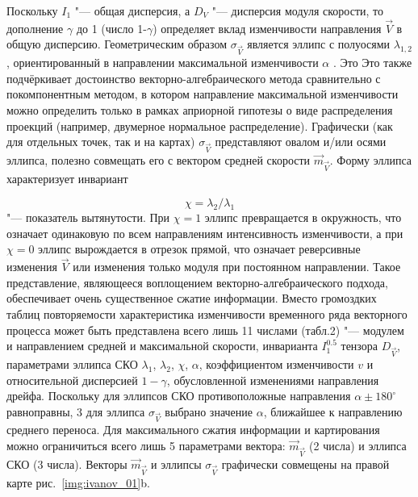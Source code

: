 {{Поскольку $I_1$ "--- общая дисперсия, а $D_V$ "--- дисперсия модуля скорости, то дополнение $\gamma$ до 1 (число 1-$\gamma$) определяет вклад изменчивости направления $\vec{V}$ в общую дисперсию.
Геометрическим образом $\sigma_{\vec{V}}$ является эллипс с полуосями $\lambda_{1,2}$ , ориентированный в направлении максимальной изменчивости $\alpha$ . Это Это также подчёркивает достоинство векторно-алгебраического метода сравнительно с покомпонентным методом, в котором направление максимальной изменчивости можно определить только в рамках априорной гипотезы о виде распределения проекций (например, двумерное нормальное распределение). Графически (как для отдельных точек, так и на картах) $\sigma_{\vec{V}}$ представляют овалом и/или осями эллипса, полезно совмещать его с вектором средней скорости $\vec{m}_{\vec{V}}$. Форму эллипса характеризует инвариант
	
\begin{equation}
\label{eq:equation3_13}
\chi=\lambda_{2}/\lambda_{1}
\end{equation} "--- показатель вытянутости. При $\chi=1$ эллипс превращается в окружность, что означает одинаковую по всем направлениям интенсивность изменчивости, а при $\chi=0$ эллипс вырождается в отрезок прямой, что означает реверсивные изменения $\vec{V}$ или изменения только модуля при постоянном направлении.
Такое представление, являющееся воплощением векторно-алгебраического подхода, обеспечивает очень существенное сжатие информации. Вместо громоздких таблиц повторяемости характеристика изменчивости временного ряда векторного процесса может быть представлена всего лишь 11 числами (табл.2) "--- модулем и направлением средней и максимальной скорости, инварианта $I^{0.5}_1$ тензора $D_{\vec{V}}$, параметрами эллипса СКО $\lambda_1$, $\lambda_2$, $\chi$, $\alpha$, коэффициентом изменчивости $v$ и относительной дисперсией $1-\gamma$, обусловленной изменениями направления дрейфа. Поскольку для эллипсов СКО противоположные направления $\alpha\pm180^{\circ}$ равноправны, 3 для эллипса $\sigma_{\vec{V}}$ выбрано значение $\alpha$, ближайшее к направлению среднего переноса. Для максимального сжатия информации и картирования можно ограничиться всего лишь 5 параметрами вектора: $\vec{m}_{\vec{V}}$ (2 числа) и эллипса СКО (3 числа). Векторы $\vec{m}_{\vec{V}}$ и эллипсы $\sigma_{\vec{V}}$ графически совмещены на правой карте рис.~\ref{img:ivanov_01}b.
 
}}
